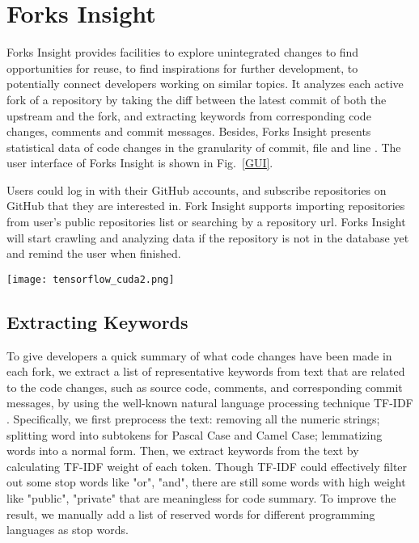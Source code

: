 \section{Forks Insight}

Forks Insight provides facilities to explore unintegrated changes to find opportunities for reuse, to find inspirations for further development, to potentially connect developers working on similar topics.
%
It analyzes each active fork of a repository by taking the diff between the latest commit of both the upstream and the fork, and extracting keywords from corresponding code changes, comments and commit messages.
%
Besides, Forks Insight presents statistical data of code changes in the granularity of commit, file and line  . The user interface of Forks Insight is shown in Fig.~\ref{GUI}.

Users could log in with their GitHub accounts, and subscribe repositories on GitHub that they are interested in. Fork Insight supports importing repositories from user's public repositories list or searching by a repository url. Forks Insight will start crawling and analyzing data if the repository is not in the database yet and remind the user when finished.

\begin{figure*}[ht]
\texttt{[image: tensorflow\_cuda2.png]}
\caption{User Interface of Forks Insight.}
\vspace{-6pt}
\label{GUI}
\end{figure*}

\subsection{Extracting Keywords}
To give developers a quick summary of what code changes have been made in each fork, we extract a list of representative keywords from text that are related to the code changes, such as source code, comments, and corresponding commit messages, by using the well-known natural language processing technique TF-IDF \cite{salton1988term}. Specifically, we first preprocess the text: removing all the numeric strings; splitting word into subtokens for Pascal Case and Camel Case; lemmatizing words into a normal form. Then, we extract keywords from the text by calculating TF-IDF weight of each token. Though TF-IDF could effectively filter out some stop words like "or", "and", there are still some words with high weight like "public", "private" that are meaningless for code summary. To improve the result, we manually add a list of  reserved words for different programming languages as stop words.

